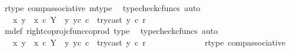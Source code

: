 \begin{isabellebody}
\ r{\isacharunderscore}{\kern0pt}type\ comp{\isacharunderscore}{\kern0pt}associative{}\ m{\isacharunderscore}{\kern0pt}type\ \isamarkupfalse%
\ {\isacharparenleft}{\kern0pt}typecheck{\isacharunderscore}{\kern0pt}cfuncs{\isacharcomma}{\kern0pt}\ auto{\isacharparenright}{\kern0pt}\isanewline
\ \ \ \ \ \ \ \ \ \ \isamarkupfalse%
\ \isamarkupfalse%
\ {\isachardoublequoteopen}{\isachardot}{\kern0pt}{\isachardot}{\kern0pt}{\isachardot}{\kern0pt}\ {\isacharequal}{\kern0pt}\ {\isacharparenleft}{\kern0pt}{\isacharparenleft}{\kern0pt}{\isasymlangle}x{}{\isacharcomma}{\kern0pt}\ y{}{\isasymrangle}\ {\isasymamalg}\ {\isasymlangle}x{}\ {\isasymcirc}\isactrlsub c\ {\isasymbeta}\isactrlbsub Y\ {\isasymsetminus}\ {\isacharparenleft}{\kern0pt}{\isasymone}{\isacharcomma}{\kern0pt}y{}{\isacharparenright}{\kern0pt}\isactrlesub {\isacharcomma}{\kern0pt}\ y{}\isactrlsup c{\isasymrangle}{\isacharparenright}{\kern0pt}\ {\isasymcirc}\isactrlsub c\ \ try{\isacharunderscore}{\kern0pt}cast\ y{}{\isacharparenright}{\kern0pt}\ {\isasymcirc}\isactrlsub c\ r{\isachardoublequoteclose}\isanewline
\ \ \ \ \ \ \ \ \ \ \ \ \isamarkupfalse%
\ m{\isacharunderscore}{\kern0pt}def\ right{\isacharunderscore}{\kern0pt}coproj{\isacharunderscore}{\kern0pt}cfunc{\isacharunderscore}{\kern0pt}coprod\ type{}\ \isamarkupfalse%
\ {\isacharparenleft}{\kern0pt}typecheck{\isacharunderscore}{\kern0pt}cfuncs{\isacharcomma}{\kern0pt}\ auto{\isacharparenright}{\kern0pt}\isanewline
\ \ \ \ \ \ \ \ \ \ \isamarkupfalse%
\ \isamarkupfalse%
\ {\isachardoublequoteopen}{\isachardot}{\kern0pt}{\isachardot}{\kern0pt}{\isachardot}{\kern0pt}\ {\isacharequal}{\kern0pt}\ {\isacharparenleft}{\kern0pt}{\isasymlangle}x{}{\isacharcomma}{\kern0pt}\ y{}{\isasymrangle}\ {\isasymamalg}\ {\isasymlangle}x{}\ {\isasymcirc}\isactrlsub c\ {\isasymbeta}\isactrlbsub Y\ {\isasymsetminus}\ {\isacharparenleft}{\kern0pt}{\isasymone}{\isacharcomma}{\kern0pt}y{}{\isacharparenright}{\kern0pt}\isactrlesub {\isacharcomma}{\kern0pt}\ y{}\isactrlsup c{\isasymrangle}{\isacharparenright}{\kern0pt}\ {\isasymcirc}\isactrlsub c\ \ {\isacharparenleft}{\kern0pt}try{\isacharunderscore}{\kern0pt}cast\ y{}\ {\isasymcirc}\isactrlsub c\ r{\isacharparenright}{\kern0pt}{\isachardoublequoteclose}\isanewline
\ \ \ \ \ \ \ \ \ \ \ \ \isamarkupfalse%
\ r{\isacharunderscore}{\kern0pt}type\ comp{\isacharunderscore}{\kern0pt}associative{}\ \isamarkupfalse%

\end{isabellebody}
